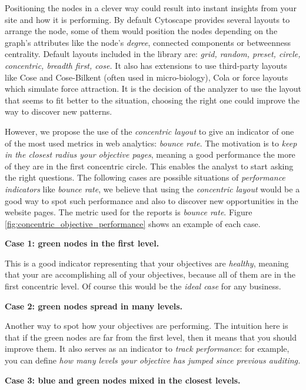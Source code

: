 \documentclass[preprint,12pt,3p]{elsarticle}
\begin{document}
Positioning the nodes in a clever way could result into instant insights from your site and how it is performing. By default Cytoscape provides several layouts to arrange the node, some of them would position the nodes depending on the graph's attributes like the node's \textit{degree}, connected components or betweenness centrality. Default layouts included in the library are: \textit{grid, random, preset, circle, concentric, breadth first, cose.}
It also has extensions to use third-party layouts like Cose and Cose-Bilkent \cite{Dogrusoz2009} (often used in micro-biology), Cola \cite{Dwyer2008} or force layouts which simulate force attraction. It is the decision of the analyzer to use the layout that seems to fit better to the situation, choosing the right one could improve the way to discover new patterns.

However, we propose the use of the \textit{concentric layout} to give an indicator of one of the most used metrics in web analytics: \textit{bounce rate}. The motivation is to \textit{keep in the closest radius your objective pages}, meaning a good performance the more of they are in the first concentric circle. This enables the analyst to start asking the right questions.
The following cases are possible situations of \textit{performance indicators} like \textit{bounce rate}, we believe that using the \textit{concentric layout} would be a good way to spot such performance and also to discover new opportunities in the website pages. The metric used for the reports is \textit{bounce rate}. Figure \ref{fig:concentric_objective_performance} shows an example of each case.

\textbf{Case 1: green nodes in the first level.}

This is a good indicator representing that your objectives are \textit{healthy}, meaning that your are accomplishing all of your objectives, because all of them are in the first concentric level. Of course this would be the \textit{ideal case} for any business.

\textbf{Case 2: green nodes spread in many levels.}

Another way to spot how your objectives are performing. The intuition here is that if the green nodes are far from the first level, then it means that you should improve them. It also serves as an indicator to \textit{track performance}: for example, you can define \textit{how many levels your objective has jumped since previous auditing.}

\textbf{Case 3: blue and green nodes mixed in the closest levels.}
\end{document}
